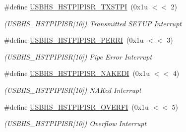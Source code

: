 \begin{DoxyCompactItemize}
\mbox{\label{group__SAME70__USBHS_ga5b657f7ffb9144716c472b4873838612}} 
\#define \mbox{\hyperlink{group__SAME70__USBHS_ga5b657f7ffb9144716c472b4873838612}{U\+S\+B\+H\+S\+\_\+\+H\+S\+T\+P\+I\+P\+I\+S\+R\+\_\+\+T\+X\+S\+T\+PI}}~(0x1u $<$$<$ 2)
\begin{DoxyCompactList}\small\item\em (U\+S\+B\+H\+S\+\_\+\+H\+S\+T\+P\+I\+P\+I\+SR\mbox{[}10\mbox{]}) Transmitted S\+E\+T\+UP Interrupt \end{DoxyCompactList}\item 
\mbox{\label{group__SAME70__USBHS_ga73998e12ffdfca1ab0bc9cf53797332c}} 
\#define \mbox{\hyperlink{group__SAME70__USBHS_ga73998e12ffdfca1ab0bc9cf53797332c}{U\+S\+B\+H\+S\+\_\+\+H\+S\+T\+P\+I\+P\+I\+S\+R\+\_\+\+P\+E\+R\+RI}}~(0x1u $<$$<$ 3)
\begin{DoxyCompactList}\small\item\em (U\+S\+B\+H\+S\+\_\+\+H\+S\+T\+P\+I\+P\+I\+SR\mbox{[}10\mbox{]}) Pipe Error Interrupt \end{DoxyCompactList}\item 
\mbox{\label{group__SAME70__USBHS_gafefe427d47e2f528a7608c5313e2e9a7}} 
\#define \mbox{\hyperlink{group__SAME70__USBHS_gafefe427d47e2f528a7608c5313e2e9a7}{U\+S\+B\+H\+S\+\_\+\+H\+S\+T\+P\+I\+P\+I\+S\+R\+\_\+\+N\+A\+K\+E\+DI}}~(0x1u $<$$<$ 4)
\begin{DoxyCompactList}\small\item\em (U\+S\+B\+H\+S\+\_\+\+H\+S\+T\+P\+I\+P\+I\+SR\mbox{[}10\mbox{]}) N\+A\+Ked Interrupt \end{DoxyCompactList}\item 
\mbox{\label{group__SAME70__USBHS_ga557f28502fc74053e78b6ee0144e37e4}} 
\#define \mbox{\hyperlink{group__SAME70__USBHS_ga557f28502fc74053e78b6ee0144e37e4}{U\+S\+B\+H\+S\+\_\+\+H\+S\+T\+P\+I\+P\+I\+S\+R\+\_\+\+O\+V\+E\+R\+FI}}~(0x1u $<$$<$ 5)
\begin{DoxyCompactList}\small\item\em (U\+S\+B\+H\+S\+\_\+\+H\+S\+T\+P\+I\+P\+I\+SR\mbox{[}10\mbox{]}) Overflow Interrupt \end{DoxyCompactList}\item 
\mbox{\label{group__SAME70__USBHS_ga49bab8fafde4c709dd7decb1c97b0503}} 

\end{DoxyCompactItemize}
